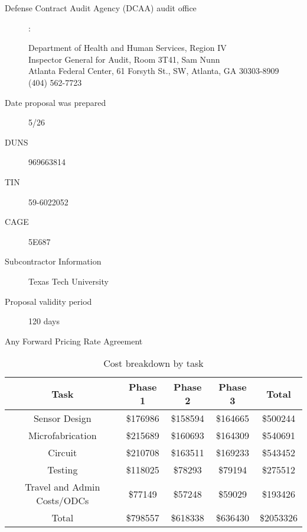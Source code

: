 \begin{description}
\item [Defense Contract Audit Agency (DCAA) audit office]:
  \begin{description}
  \item [Department of Health and Human Services, Region IV]
  \item [Inspector General for Audit, Room 3T41, Sam Nunn]
  \item [Atlanta Federal Center, 61 Forsyth St., SW, Atlanta, GA 30303-8909]
  \item [(404) 562-7723]
  \end{description}
\item [Date proposal was prepared] 5/26
\item [DUNS] 969663814
\item [TIN] 59-6022052
\item [CAGE] 5E687
\item [Subcontractor Information] Texas Tech University
\item [Proposal validity period] 120 days
\item [Any Forward Pricing Rate Agreement]
  
\end{description}


\setcounter{section}{0}
\begin{table}[h!]
  \centering
  \begin{tabular}{|c||c|c|c|c|}
    \hline
    Task & Phase 1 & Phase 2 & Phase 3 & Total\\
    \hline
    \hline
    Sensor Design & \$176986 & \$158594 & \$164665 & \$500244 \\
    \hline
    Microfabrication & \$215689 & \$160693 & \$164309 & \$540691 \\
    \hline
    Circuit & \$210708 & \$163511 & \$169233 & \$543452 \\
    \hline
    Testing & \$118025 & \$78293 & \$79194 & \$275512 \\
    \hline
    Travel and Admin Costs/ODCs & \$77149 & \$57248 & \$59029 & \$193426 \\
    \hline
    Total & \$798557 & \$618338 & \$636430 & \$2053326 \\
    \hline
  \end{tabular}
  \caption{Cost breakdown by task}
  \label{tab:taskcost}
\end{table}

